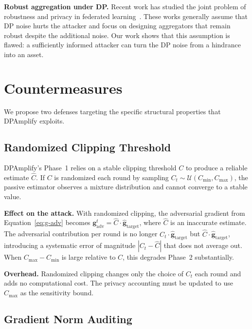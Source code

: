 \documentclass[conference]{IEEEtran}
\begin{document}
\textbf{Robust aggregation under DP.}
Recent work has studied the joint problem of robustness
and privacy in federated learning~\cite{yin2018byzantine}.
These works generally assume that DP noise hurts the
attacker and focus on designing aggregators that remain
robust despite the additional noise. Our work shows
that this assumption is flawed: a sufficiently
informed attacker can turn the DP noise from a
hindrance into an asset.

\section{Countermeasures}
\label{sec:countermeasures}

We propose two defenses targeting the specific
structural properties that DPAmplify exploits.

\subsection{Randomized Clipping Threshold}

DPAmplify's Phase~1 relies on a stable clipping
threshold $C$ to produce a reliable estimate $\hat{C}$.
If $C$ is randomized each round by sampling
$C_t \sim \mathcal{U}(C_{\min}, C_{\max})$, the
passive estimator observes a mixture distribution and
cannot converge to a stable value.

\textbf{Effect on the attack.} With randomized
clipping, the adversarial gradient from
Equation~\ref{eq:g-adv} becomes
$\mathbf{g}_{\mathrm{adv}}^t =
\hat{C} \cdot \hat{\mathbf{g}}_{\mathrm{target}}$,
where $\hat{C}$ is an inaccurate estimate. The
adversarial contribution per round is no longer
$C_t \cdot \hat{\mathbf{g}}_{\mathrm{target}}$ but
$\hat{C} \cdot \hat{\mathbf{g}}_{\mathrm{target}}$,
introducing a systematic error of magnitude
$|C_t - \hat{C}|$ that does not average out.
When $C_{\max} - C_{\min}$ is large relative to $C$,
this degrades Phase~2 substantially.

\textbf{Overhead.} Randomized clipping changes only
the choice of $C_t$ each round and adds no
computational cost. The privacy accounting must be
updated to use $C_{\max}$ as the sensitivity bound.

\subsection{Gradient Norm Auditing}
\end{document}
